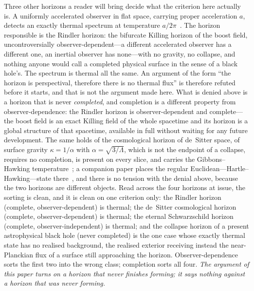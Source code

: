 \documentclass[11pt,a4paper]{article}
\theoremstyle{plain}
\theoremstyle{remark}
\begin{document}
Three other horizons a reader will bring decide what the criterion here actually is. A uniformly accelerated observer in flat space, carrying proper acceleration $a$, detects an exactly thermal spectrum at temperature $a/2\pi$~\cite{Unruh1976}. The horizon responsible is the Rindler horizon: the bifurcate Killing horizon of the boost field, uncontroversially observer-dependent---a different accelerated observer has a different one, an inertial observer has none---with no gravity, no collapse, and nothing anyone would call a completed physical surface in the sense of a black hole's. The spectrum is thermal all the same. An argument of the form ``the horizon is perspectival, therefore there is no thermal flux'' is therefore refuted before it starts, and that is not the argument made here. What is denied above is a horizon that is never \emph{completed}, and completion is a different property from observer-dependence: the Rindler horizon is observer-dependent and complete---the boost field is an exact Killing field of the whole spacetime and its horizon is a global structure of that spacetime, available in full without waiting for any future development. The same holds of the cosmological horizon of de~Sitter space, of surface gravity $\kappa=1/\alpha$ with $\alpha=\sqrt{3/\Lambda}$, which is not the endpoint of a collapse, requires no completion, is present on every slice, and carries the Gibbons--Hawking temperature~\cite{GibbonsHawking1977}; a companion paper places the regular Euclidean---Hartle--Hawking---state there~\cite{JanzenCanonicalTime}, and there is no tension with the denial above, because the two horizons are different objects. Read across the four horizons at issue, the sorting is clean, and it is clean on one criterion only: the Rindler horizon (complete, observer-dependent) is thermal; the de~Sitter cosmological horizon (complete, observer-dependent) is thermal; the eternal Schwarzschild horizon (complete, observer-independent) is thermal; and the collapse horizon of a present astrophysical black hole (never completed) is the one case whose exactly thermal state has no realised background, the realised exterior receiving instead the near-Planckian flux of a surface still approaching the horizon. Observer-dependence sorts the first two into the wrong class; completion sorts all four. \emph{The argument of this paper turns on a horizon that never finishes forming; it says nothing against a horizon that was never forming.}
\end{document}
